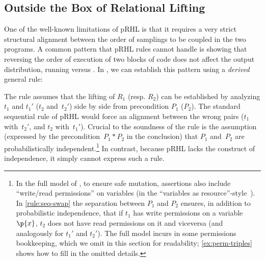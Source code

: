 \subsection{Outside the Box of Relational Lifting}
\label{sec:overview:obox}





One of the well-known limitations of pRHL is that it requires
a very strict structural alignment between the order of samplings
to be coupled in the two programs.
A common pattern that pRHL rules cannot handle is
showing that reversing the order of execution of two blocks of code
does not affect the output distribution,
\eg running
   versus
  .
In \thelogic, we can establish this pattern using a \emph{derived} general rule:
\begin{proofrule}
  \label{rule:seq-swap}
\end{proofrule}
The rule assumes that the lifting of $R_1$ (resp. $R_2$) can be established
by analyzing $t_1$ and $t_1'$ ($t_2$ and~$t_2'$)
side by side from precondition $P_1$ ($P_2$).
The standard sequential rule of pRHL would force an alignment
between the wrong pairs ($t_1$ with~$t_2'$, and $t_2$ with~$t_1'$).
Crucial to the soundness of the rule is the assumption
(expressed by the precondition~$P_1*P_2$ in the conclusion)
that $P_1$ and~$P_2$ are probabilistically independent.\footnote{
  In the full model of \thelogic,
  to ensure safe mutation, assertions also include ``write/read permissions''
  on variables (in the ``variables as resource''-style~\cite{BornatCY06}).
  In \ref{rule:seq-swap} the separation between $P_1$ and $P_2$ ensures,
  in addition to probabilistic independence, that if $t_1$ has write permissions
  on a variable~$\p{x}$, $t_2$ does not have read permissions on it and viceversa (and analogously for $t_1'$ and $t_2'$).
  The full model incurs in some permissions bookkeeping,
  which we omit in this section for readability;
  \cref{ex:perm-triples} shows how to fill in the omitted details.}
In contrast, because pRHL lacks the construct of independence,
it simply cannot express such a rule.

